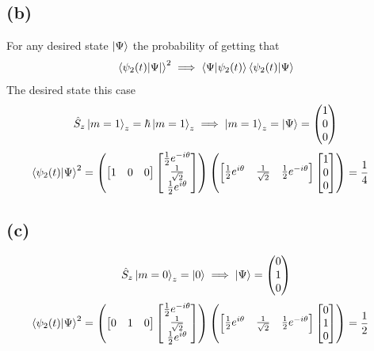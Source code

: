 \documentclass[letter, 10pts]{article}
\newcommand{\hb}{\hbar}
\begin{document}
\subsection*{(b)} 
For any desired state $\ket{\Psi}$ the probability of getting that 
\[
\braket{ \psi_2(t) | \Psi | } ^2 \implies \braket{\Psi | \psi_2(t)}
\braket{\psi_2(t) | \Psi} \] 
The desired state this case 
\[
	\hat{S}_z \ket{m = 1}_z = \hb \ket{m=1}_z  \implies \ket{m = 1}_z = \ket{\Psi} = \begin{pmatrix} 1 \\ 0 \\ 0 \end{pmatrix} 
\] 
\begin{align*}
	\braket{\psi_2(t) | \Psi} ^2 &= 
	\left(
	\begin{bmatrix} 1&0&0 \end{bmatrix} 
 \begin{bmatrix} \frac{1}{2} e^{- i \theta} \\ \frac{1}{\sqrt{2} } \\ \frac{1}{2}e^{i \theta} \end{bmatrix} 
	\right)
	\left(
	\begin{bmatrix} \frac{1}{2} e^{ i \theta} & \frac{1}{\sqrt{2} } & \frac{1}{2}e^{- i \theta} \end{bmatrix} 
	\begin{bmatrix} 1\\0\\0 \end{bmatrix} 
	\right) = \frac{1}{4}
\end{align*}
\subsection*{(c)} 
\begin{align*}
	\hat{S}_z \ket{m=0}_z = \ket{0} \implies  \ket{\Psi} = \begin{pmatrix} 0\\1\\0 \end{pmatrix} 
\end{align*}
\begin{align*}
	\braket{\psi_2(t) | \Psi} ^2 &= 
	\left(
	\begin{bmatrix} 0&1&0 \end{bmatrix} 
 \begin{bmatrix} \frac{1}{2} e^{- i \theta} \\ \frac{1}{\sqrt{2} } \\ \frac{1}{2}e^{i \theta} \end{bmatrix} 
	\right)
	\left(
	\begin{bmatrix} \frac{1}{2} e^{ i \theta} & \frac{1}{\sqrt{2} } & \frac{1}{2}e^{- i \theta} \end{bmatrix} 
	\begin{bmatrix} 0\\1\\0 \end{bmatrix} 
	\right) = \frac{1}{2}
\end{align*}
\end{document}
